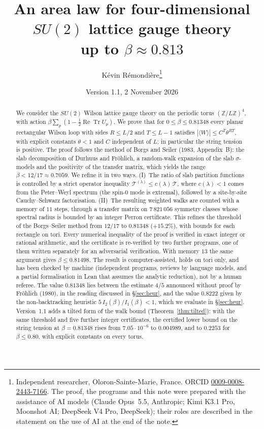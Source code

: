 \documentclass[11pt,a4paper]{article}
\title{An area law for four-dimensional $SU(2)$ lattice gauge theory\\ up to $\beta\approx0.813$}
\author{K\'evin R\'emondi\`ere\thanks{Independent researcher, Oloron-Sainte-Marie, France. ORCID
\href{https://orcid.org/0009-0008-2443-7166}{0009-0008-2443-7166}. The proof, the programs and this note were prepared with
the assistance of AI models (Claude Opus~5.5, Anthropic; Kimi K3.1 Pro, Moonshot AI; DeepSeek V4 Pro, DeepSeek); their roles are
described in the statement on the use of AI at the end of the note.}}
\date{Version 1.1, 2 November 2026}
\theoremstyle{plain}
\theoremstyle{remark}
\numberwithin{equation}{section}
\newcommand{\Z}{\mathbb{Z}}
\newcommand{\ReTr}{\operatorname{Re}\operatorname{Tr}}
\newcommand{\cT}{\mathcal{T}}
\begin{document}
\maketitle

\begin{abstract}
We consider the $SU(2)$ Wilson lattice gauge theory on the periodic torus $(\Z/L\Z)^4$, with action
$\beta\sum_p(1-\tfrac12\ReTr U_p)$. We prove that for $0\le\beta\le0.81348$ every planar rectangular Wilson loop with sides
$R\le L/2$ and $T\le L-1$ satisfies $|\langle W\rangle|\le C^T\theta^{RT}$, with explicit constants $\theta<1$ and $C$ independent
of $L$; in particular the string tension is positive. The proof follows the method of Borgs and Seiler (1983, Appendix~B): the slab
decomposition of Durhuus and Fr\"ohlich, a random-walk expansion of the slab $\sigma$-models and the positivity of the transfer
matrix, which yields the range $\beta<12/17\approx0.7059$. We refine it in two ways. (I)~The ratio of slab partition
functions is controlled by a strict operator inequality $\cT^{(\lambda)}\le c(\lambda)\,\cT$, where $c(\lambda)<1$ comes from the
Peter--Weyl spectrum (the spin-$0$ mode is extremal), followed by a site-by-site Cauchy--Schwarz factorisation. (II)~The resulting
weighted walks are counted with a memory of $11$ steps, through a transfer matrix on $7\,821\,056$ symmetry classes whose spectral
radius is bounded by an integer Perron certificate. This refines the threshold of the Borgs--Seiler method from $12/17$ to
$0.81348$ ($+15.2\%$), with bounds for each rectangle on tori. Every numerical inequality of the proof is verified in exact integer or rational
arithmetic, and the certificate is re-verified by two further programs, one of them written separately for an adversarial
verification. With memory $13$ the same argument gives
$\beta\le0.81498$. The result is computer-assisted, holds on tori only, and has been checked by machine (independent programs,
reviews by language models, and a partial formalisation in Lean that assumes the analytic reduction), not by a human referee. The value $0.81348$ lies between the estimate $4/5$ announced without proof by
Fr\"ohlich (1980), in the reading discussed in \S\ref{sec:heur}, and the value $0.8222$ given by the non-backtracking heuristic
$5\,I_2(\beta)/I_1(\beta)<1$, which we evaluate in \S\ref{sec:heur}. Version~1.1 adds a tilted form of the walk bound
(Theorem~\ref{thm:tilted}): with the same threshold and five further integer certificates, the certified lower bound on the string
tension at $\beta=0.81348$ rises from $7.05\cdot10^{-6}$ to $0.004989$, and to $0.2253$ for $\beta\le0.80$, with explicit constants on
every torus.
\end{abstract}
\end{document}
